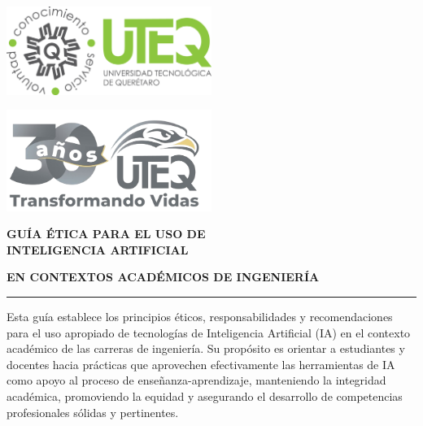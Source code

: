 \documentclass[11pt, letterpaper]{article}
\begin{document}
	
	\begin{center}
		\begin{minipage}{0.45\textwidth}
			\begin{center}
				\includegraphics[width=0.5\textwidth]{Imagenes/Logo_uteq.png}
			\end{center}
		\end{minipage}%
		\hfill
		\begin{minipage}{0.45\textwidth}
			\begin{center}
				\includegraphics[width=0.5\textwidth]{Imagenes/Logo_uteq_30.png}
			\end{center}
		\end{minipage}
		
		{\color{uteqGreen}\huge\bfseries GUÍA ÉTICA PARA EL USO DE\\
			\vspace{0.15cm}
			INTELIGENCIA ARTIFICIAL}
		
		\vspace{0.3cm}
		{\large\bfseries EN CONTEXTOS ACADÉMICOS DE INGENIERÍA}
		
		\vspace{0.5cm}
		\rule{\textwidth}{3pt}
	\end{center}
	
	\begin{tcolorbox}[colback=uteqGreen!10, colframe=uteqGreen, title=Presentación]
		Esta guía establece los principios éticos, responsabilidades y recomendaciones para el uso apropiado de tecnologías de Inteligencia Artificial (IA) en el contexto académico de las carreras de ingeniería. Su propósito es orientar a estudiantes y docentes hacia prácticas que aprovechen efectivamente las herramientas de IA como apoyo al proceso de enseñanza-aprendizaje, manteniendo la integridad académica, promoviendo la equidad y asegurando el desarrollo de competencias profesionales sólidas y pertinentes.
	\end{tcolorbox}
	
\end{document}
